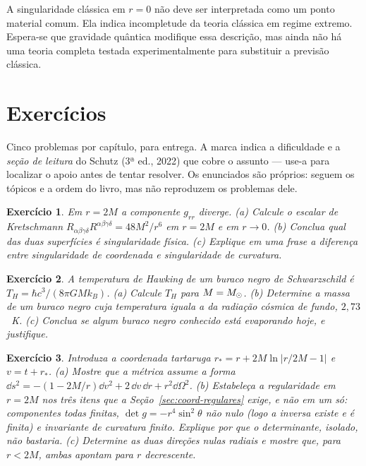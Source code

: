 \documentclass[12pt,a4paper,oneside]{book}
\theoremstyle{rgplain}
\newtheorem{exercise}{Exercício}[chapter]
\theoremstyle{rgremark}
\begin{document}
A singularidade clássica em $r=0$ não deve ser interpretada como um ponto
material comum. Ela indica incompletude da teoria clássica em regime extremo.
Espera-se que gravidade quântica modifique essa descrição, mas ainda não há
uma teoria completa testada experimentalmente para substituir a previsão
clássica.

\clearpage


\clearpage
\section{Exercícios}
\begin{leitura}
Cinco problemas por capítulo, para entrega. A marca indica a dificuldade e a \emph{seção de leitura} do Schutz (3ª ed., 2022) que cobre o assunto --- use-a para localizar o apoio antes de tentar resolver. Os enunciados são próprios: seguem os tópicos e a ordem do livro, mas não reproduzem os problemas dele.
\end{leitura}

\begin{exercise}
Em $r=2M$ a componente $g_{rr}$ diverge. (a) Calcule o escalar de Kretschmann
$R_{\alpha\beta\gamma\delta}R^{\alpha\beta\gamma\delta}=48M^2/r^6$ em
$r=2M$ e em $r\to0$. (b) Conclua qual das duas superfícies é singularidade
física. (c) Explique em uma frase a diferença entre singularidade de
coordenada e singularidade de curvatura.
\end{exercise}

\begin{exercise}
A temperatura de Hawking de um buraco negro de Schwarzschild é
$T_H=\hbar c^3/(8\pi GMk_B)$. (a) Calcule $T_H$ para $M=M_\odot$.
(b) Determine a massa de um buraco negro cuja temperatura iguala a da radiação
cósmica de fundo, $2{,}73$~K. (c) Conclua se algum buraco negro conhecido está
evaporando hoje, e justifique.
\end{exercise}

\begin{exercise}
Introduza a coordenada tartaruga $r_*=r+2M\ln|r/2M-1|$ e
$v=t+r_*$. (a) Mostre que a métrica assume a forma
$\dd s^2=-(1-2M/r)\dd v^2+2\,\dd v\,\dd r+r^2\dd\Omega^2$. (b) Estabeleça a
regularidade em $r=2M$ nos três itens que a Seção~\ref{sec:coord-regulares}
exige, e não em um só: componentes todas finitas, $\det g=-r^4\sin^2\theta$ não
nulo (logo a inversa existe e é finita) e invariante de curvatura finito.
Explique por que o determinante, isolado, não bastaria. (c) Determine as duas
direções nulas radiais e mostre que, para $r<2M$, ambas apontam para $r$
decrescente.
\end{exercise}
\end{document}
